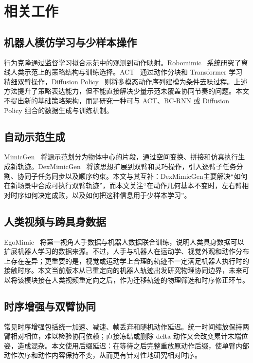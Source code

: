 \section{相关工作}

\subsection{机器人模仿学习与少样本操作}

行为克隆通过监督学习拟合示范中的观测到动作映射。Robomimic~\cite{mandlekar2021robomimic} 系统研究了离线人类示范上的策略结构与训练选择。ACT~\cite{zhao2023act} 通过动作分块和 Transformer 学习精细双臂操作，Diffusion Policy~\cite{chi2023diffusion} 则将多模态动作序列建模为条件去噪过程。上述方法提升了策略表达能力，但不能直接解决少量示范未覆盖协同节奏的问题。本文不提出新的基础策略架构，而是研究一种可与 ACT、BC-RNN 或 Diffusion Policy 组合的数据生成与训练机制。

\subsection{自动示范生成}

MimicGen~\cite{mandlekar2023mimicgen} 将源示范划分为物体中心的片段，通过空间变换、拼接和仿真执行生成新轨迹。DexMimicGen~\cite{jiang2024dexmimicgen} 将该思想扩展到双臂和灵巧操作，引入逐臂子任务分割、协同子任务同步以及顺序约束。本文与其互补：DexMimicGen主要解决“如何在新场景中合成可执行双臂轨迹”，而本文关注“在动作几何基本不变时，左右臂相对时序如何决定成败，以及如何把这种信息用于少样本学习”。

\subsection{人类视频与跨具身数据}

EgoMimic~\cite{kareer2024egomimic} 将第一视角人手数据与机器人数据联合训练，说明人类具身数据可以扩展机器人学习的数据来源。不过，人手与机器人在运动学、视觉外观和动作分布上存在差异；更重要的是，视觉或运动学上合理的轨迹不一定满足机器人执行时的接触时序。本文当前版本从已重定向的机器人轨迹出发研究物理协同边界，未来可以将该模块接在人类视频重定向之后，作为迁移轨迹的物理筛选和时序修正环节。

\subsection{时序增强与双臂协同}

常见时序增强包括统一加速、减速、帧丢弃和随机动作延迟。统一时间缩放保持两臂相对相位，难以检验协同依赖；直接冻结或删除 delta 动作又会改变累计末端位姿，造成混杂。本文使用后缀延迟：在等待之后完整重放原动作后缀，使单臂内部动作次序和动作内容保持不变，从而更有针对性地研究相对时序。
